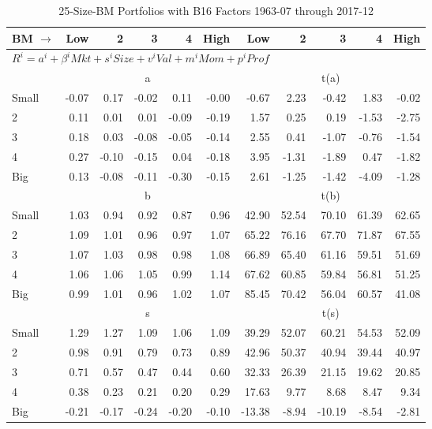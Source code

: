 
\begin{table}[!ht]
\footnotesize
\centering
\caption{25-Size-BM Portfolios with B16 Factors 1963-07 through 2017-12}
\begin{tabular}{lrrrrrrrrrr}
  \toprule
    
    BM $\rightarrow$ & Low & 2 & 3 & 4 & High & Low & 2 & 3 & 4 & High  \\ 
  \midrule
  \multicolumn{11}{l}{$R^i=a^i+\beta^iMkt+s^iSize+v^iVal+m^iMom+p^iProf$}  \\
  
     & \multicolumn{5}{c}{a} & \multicolumn{5}{c}{t(a)}   \\
     \cmidrule(r){2-6} \cmidrule(r){7-11} 
    Small  & -0.07  & 0.17  & -0.02  & 0.11  & -0.00  & -0.67  & 2.23  & -0.42  & 1.83  & -0.02   \\
    2  & 0.11  & 0.01  & 0.01  & -0.09  & -0.19  & 1.57  & 0.25  & 0.19  & -1.53  & -2.75   \\
    3  & 0.18  & 0.03  & -0.08  & -0.05  & -0.14  & 2.55  & 0.41  & -1.07  & -0.76  & -1.54   \\
    4  & 0.27  & -0.10  & -0.15  & 0.04  & -0.18  & 3.95  & -1.31  & -1.89  & 0.47  & -1.82   \\
    Big  & 0.13  & -0.08  & -0.11  & -0.30  & -0.15  & 2.61  & -1.25  & -1.42  & -4.09  & -1.28   \\
    
  
     & \multicolumn{5}{c}{b} & \multicolumn{5}{c}{t(b)}   \\
     \cmidrule(r){2-6} \cmidrule(r){7-11} 
    Small  & 1.03  & 0.94  & 0.92  & 0.87  & 0.96  & 42.90  & 52.54  & 70.10  & 61.39  & 62.65   \\
    2  & 1.09  & 1.01  & 0.96  & 0.97  & 1.07  & 65.22  & 76.16  & 67.70  & 71.87  & 67.55   \\
    3  & 1.07  & 1.03  & 0.98  & 0.98  & 1.08  & 66.89  & 65.40  & 61.16  & 59.51  & 51.69   \\
    4  & 1.06  & 1.06  & 1.05  & 0.99  & 1.14  & 67.62  & 60.85  & 59.84  & 56.81  & 51.25   \\
    Big  & 0.99  & 1.01  & 0.96  & 1.02  & 1.07  & 85.45  & 70.42  & 56.04  & 60.57  & 41.08   \\
    
  
     & \multicolumn{5}{c}{s} & \multicolumn{5}{c}{t(s)}   \\
     \cmidrule(r){2-6} \cmidrule(r){7-11} 
    Small  & 1.29  & 1.27  & 1.09  & 1.06  & 1.09  & 39.29  & 52.07  & 60.21  & 54.53  & 52.09   \\
    2  & 0.98  & 0.91  & 0.79  & 0.73  & 0.89  & 42.96  & 50.37  & 40.94  & 39.44  & 40.97   \\
    3  & 0.71  & 0.57  & 0.47  & 0.44  & 0.60  & 32.33  & 26.39  & 21.15  & 19.62  & 20.85   \\
    4  & 0.38  & 0.23  & 0.21  & 0.20  & 0.29  & 17.63  & 9.77  & 8.68  & 8.47  & 9.34   \\
    Big  & -0.21  & -0.17  & -0.24  & -0.20  & -0.10  & -13.38  & -8.94  & -10.19  & -8.54  & -2.81   \\
    

\end{tabular}
\end{table}

